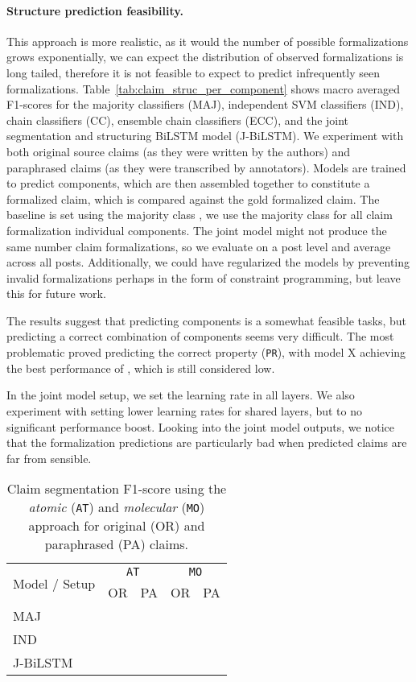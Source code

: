 \paragraph{Structure prediction feasibility. }
This approach is more realistic, as it would the number of possible
formalizations grows exponentially, we can expect the distribution of observed
formalizations is long tailed, therefore it is not feasible to expect to
predict infrequently seen formalizations.
Table~\ref{tab:claim_struc_per_component} shows macro averaged F1-scores for
the majority classifiers (MAJ), independent SVM classifiers (IND), chain
classifiers (CC), ensemble chain classifiers (ECC), and the joint segmentation
and structuring BiLSTM model (J-BiLSTM).  We experiment with both original
source claims (as they were written by the authors) and paraphrased claims (as
they were transcribed by annotators).
Models are trained to predict components, which are then assembled together to 
constitute a formalized claim, which is compared against the gold formalized claim. 
The baseline is set using the majority 
class , we use the majority class for all claim formalization individual 
components. 
The joint model might not produce the same number claim formalizations, 
so we evaluate on a post level and average across all posts. 
Additionally, we could have regularized the models by preventing invalid
formalizations perhaps in the form of constraint programming, but leave this
for future work. 

The results suggest that predicting components is a somewhat feasible tasks,
but predicting a correct combination of components seems very difficult.  The
most problematic proved predicting the correct property (\texttt{PR}), with
model X achieving the best performance of , which is still considered low. 

In the joint model setup, we set the learning rate in all layers. 
We also experiment with setting lower learning rates for shared layers,
but to no significant performance boost. 
Looking into the joint model outputs, we notice that the formalization predictions
are particularly bad when predicted claims are far from sensible. 

\begin{table}
	\centering
	\begin{tabular}{p{3cm} c c c c }
	\toprule
		\multirow{2}{*}{Model / Setup}
		& \multicolumn{2}{c}{\texttt{AT}}
		& \multicolumn{2}{c}{\texttt{MO}}
		\\
		& OR  & PA  & OR  & PA \\
		\midrule

		MAJ & & & &  \\
		IND & & & & \\		
		J-BiLSTM & & & & \\

		\bottomrule
	\end{tabular}
	\caption{Claim segmentation
	F1-score using the 
	\emph{atomic} (\texttt{AT}) and \emph{molecular} (\texttt{MO})
	approach for original (OR) and paraphrased (PA) claims. 
	}
	\label{tab:claim_struc_atomic_molecular}
\end{table}

